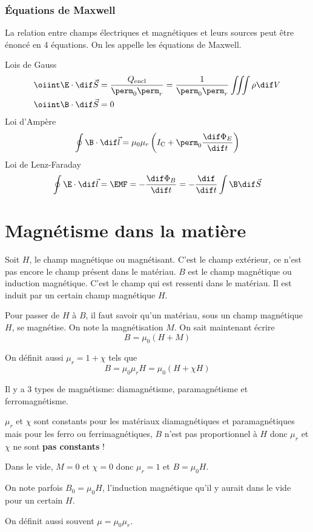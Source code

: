 \section{Équations de Maxwell}
La relation entre champs électriques et magnétiques et leurs sources peut être énoncé en 4 équations.
On les appelle les équations de Maxwell.

Lois de Gauss
\begin{align*}
	\oiint \E \cdot \dif \vec S &= \frac{Q_\mathrm{encl}}{\perm_0\perm_r}
    = \frac{1}{\perm_0\perm_r}\iiint \rho \dif V\\
	\oiint \B \cdot \dif \vec S &= 0
\end{align*}
Loi d'Ampère
\[ \oint \B \cdot \dif \vec l =
\mu_0\mu_r \left(I_\mathrm{C} + \perm_0 \frac{\dif \Phi_E}{\dif t}\right) \]
Loi de Lenz-Faraday
\[ \oint \E \cdot \dif \vec l = \EMF = - \frac{\dif \Phi_B}{\dif t}
= - \frac{\dif}{\dif t}\int \B \dif \vec S \]

\part{Magnétisme dans la matière}
Soit $H$, le champ magnétique ou magnétisant.
C'est le champ extérieur, ce n'est pas encore le champ présent dans le matériau.
$B$ est le champ magnétique ou induction magnétique.
C'est le champ qui est ressenti dans le matériau.
Il est induit par un certain champ magnétique $H$.

Pour passer de $H$ à $B$,
il faut savoir qu'un matériau,
sous un champ magnétique $H$, se magnétise.
On note la magnétisation $M$.
On sait maintenant écrire
\[ B = \mu_0 (H + M) \]

On définit aussi $\mu_r = 1 + \chi$ tels que
\[ B = \mu_0\mu_r H = \mu_0 (H + \chi H) \]

Il y a 3 types de magnétisme: diamagnétisme, paramagnétisme et ferromagnétisme.

$\mu_r$ et $\chi$ sont constants pour les matériaux diamagnétiques et
paramagnétiques mais pour les ferro ou ferrimagnétiques,
$B$ n'est pas proportionnel à $H$ donc
$\mu_r$ et $\chi$ ne sont \textbf{pas constants} !

Dans le vide, $M = 0$ et $\chi = 0$ donc $\mu_r = 1$ et $B = \mu_0 H$.

On note parfois $B_0 = \mu_0 H$,
l'induction magnétique qu'il y aurait dans le vide pour un certain $H$.

On définit aussi souvent $\mu = \mu_0 \mu_r$.

